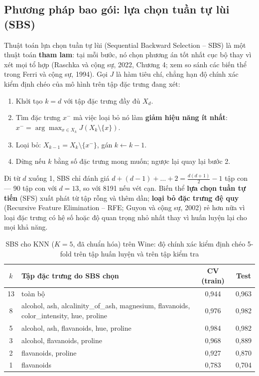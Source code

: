 \subsection{Phương pháp bao gói: lựa chọn tuần tự lùi (SBS)}

Thuật toán lựa chọn tuần tự lùi (Sequential Backward Selection -- SBS) là một thuật toán \textbf{tham lam}: tại mỗi bước, nó chọn phương án tốt nhất cục bộ thay vì xét mọi tổ hợp (Raschka và cộng sự, 2022, Chương 4; xem so sánh các biến thể trong Ferri và cộng sự, 1994). Gọi $J$ là hàm tiêu chí, chẳng hạn độ chính xác kiểm định chéo của mô hình trên tập đặc trưng đang xét:
\begin{enumerate}
    \item Khởi tạo $k = d$ với tập đặc trưng đầy đủ $X_d$.
    \item Tìm đặc trưng $x^{-}$ mà việc loại bỏ nó làm \textbf{giảm hiệu năng ít nhất}: $x^{-} = \arg\max_{x \in X_k} J(X_k \setminus \{x\})$.
    \item Loại bỏ: $X_{k-1} = X_k \setminus \{x^{-}\}$, gán $k \leftarrow k - 1$.
    \item Dừng nếu $k$ bằng số đặc trưng mong muốn; ngược lại quay lại bước 2.
\end{enumerate}
Đi từ $d$ xuống 1, SBS chỉ đánh giá $d + (d - 1) + \dots + 2 = \frac{d(d+1)}{2} - 1$ tập con --- 90 tập con với $d = 13$, so với 8191 nếu vét cạn. Biến thể \textbf{lựa chọn tuần tự tiến} (SFS) xuất phát từ tập rỗng và thêm dần; \textbf{loại bỏ đặc trưng đệ quy} (Recursive Feature Elimination -- RFE; Guyon và cộng sự, 2002) rẻ hơn nữa vì loại đặc trưng có hệ số hoặc độ quan trọng nhỏ nhất thay vì huấn luyện lại cho mọi khả năng.

\begin{table}[H]
\centering
\small
\begin{tabular}{|c|p{7.6cm}|c|c|}
\hline
\textbf{$k$} & \textbf{Tập đặc trưng do SBS chọn} & \textbf{CV (train)} & \textbf{Test} \\
\hline
13 & toàn bộ & 0,944 & 0,963 \\ \hline
8 & alcohol, ash, alcalinity\_of\_ash, magnesium, flavanoids, color\_intensity, hue, proline & 0,976 & 0,982 \\ \hline
5 & alcohol, ash, flavanoids, hue, proline & 0,984 & 0,982 \\ \hline
3 & alcohol, flavanoids, proline & 0,968 & 0,889 \\ \hline
2 & flavanoids, proline & 0,927 & 0,870 \\ \hline
1 & flavanoids & 0,783 & 0,704 \\ \hline
\end{tabular}
\caption{SBS cho KNN ($K = 5$, đã chuẩn hóa) trên Wine: độ chính xác kiểm định chéo 5-fold trên tập huấn luyện và trên tập kiểm tra}
\label{tab:sbs-wine}
\end{table}

